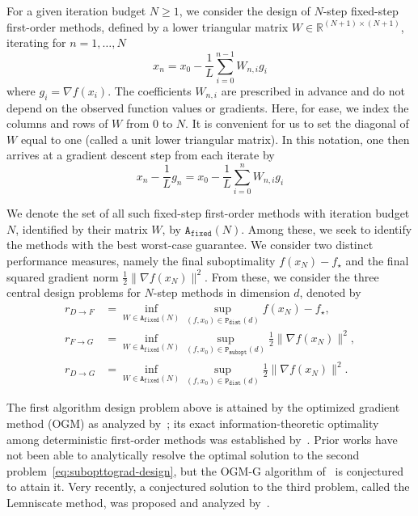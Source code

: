 \documentclass[11pt]{article}
\begin{document}
For a given iteration budget $N\geq 1$, we consider the design of $N$-step fixed-step first-order methods, defined by a lower triangular matrix $W\in\mathbb{R}^{(N+1)\times(N+1)}$, iterating for $n=1,\dots,N$
\begin{equation}
    x_n = x_{0} - \frac{1}{L}\sum_{i=0}^{n-1} W_{n,i} g_i \label{eq:fixed-step-definition}
\end{equation}
where $g_i=\nabla f(x_i)$. The coefficients $W_{n,i}$ are prescribed in advance and do not depend on the observed function values or gradients. Here, for ease, we index the columns and rows of $W$ from $0$ to $N$. It is convenient for us to set the diagonal of $W$ equal to one (called a unit lower triangular matrix). In this notation, one then arrives at a gradient descent step from each iterate by
\begin{equation*}
    x_n - \frac{1}{L} g_n = x_{0} - \frac{1}{L}\sum_{i=0}^{n} W_{n,i} g_i
\end{equation*}

We denote the set of all such fixed-step first-order methods with iteration budget $N$, identified by their matrix $W$, by $\mathtt{A}_\mathtt{fixed}(N)$. Among these, we seek to identify the methods with the best worst-case guarantee. We consider two distinct performance measures, namely the final suboptimality $f(x_N)-f_\star$ and the final squared gradient norm $\frac{1}{2}\|\nabla f(x_N)\|^2$. From these, we consider the three central design problems for $N$-step methods in dimension $d$, denoted by
\begin{align}
    r_{D\rightarrow F} &= \inf_{W\in\mathtt{A}_\mathtt{fixed}(N)} \sup_{(f,x_0)\in\mathtt{P}_\mathtt{dist}(d)} f(x_N)-f_\star, \label{eq:disttosubopt-design}\\
    r_{F\rightarrow G} &= \inf_{W\in\mathtt{A}_\mathtt{fixed}(N)} \sup_{(f,x_0)\in\mathtt{P}_\mathtt{subopt}(d)} \frac{1}{2}\|\nabla f(x_N)\|^2, \label{eq:subopttograd-design}\\
    r_{D\rightarrow G} &= \inf_{W\in\mathtt{A}_\mathtt{fixed}(N)} \sup_{(f,x_0)\in\mathtt{P}_\mathtt{dist}(d)} \frac{1}{2}\|\nabla f(x_N)\|^2. \label{eq:disttograd-design}    
\end{align}

The first algorithm design problem above is attained by the optimized gradient method (OGM) as analyzed by~\cite{KF16}; its exact information-theoretic optimality among deterministic first-order methods was established by~\cite{DR17}. Prior works have not been able to analytically resolve the optimal solution to the second problem~\eqref{eq:subopttograd-design}, but the OGM-G algorithm of~\cite{KF21} is conjectured to attain it. Very recently, a conjectured solution to the third problem, called the Lemniscate method, was proposed and analyzed by~\cite{KimRyuDasGupta26}.
\end{document}

